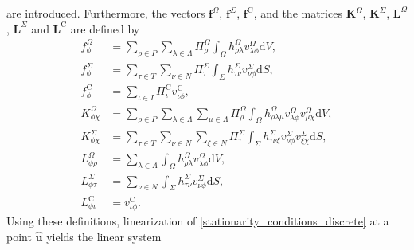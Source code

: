 \documentclass[pdftex,a4paper,12pt,abstracton]{scrartcl}
\begin{document}
are introduced. 
Furthermore, the vectors $\boldsymbol{f}^\Omega$, $\boldsymbol{f}^\Sigma$, $\boldsymbol{f}^\mathrm{C}$, and the matrices $\boldsymbol{K}^\Omega$, $\boldsymbol{K}^\Sigma$, $\boldsymbol{L}^\Omega$, $\boldsymbol{L}^\Sigma$ and $\boldsymbol{L}^\mathrm{C}$ are defined by
\begin{equation}
\begin{split}
f^\Omega_\phi &= \sum_{\rho \in P} \sum_{\lambda \in \Lambda} \Pi^\Omega_\rho \int_\Omega h^\Omega_{\rho\lambda} v^\Omega_{\lambda\phi} \mathrm{d}V,\\
f^\Sigma_\phi &= \sum_{\tau \in T} \sum_{\nu \in N} \Pi^\Sigma_\tau \int_\Sigma h^\Sigma_{\tau\nu} v^\Sigma_{\nu\phi} \mathrm{d}S,\\
f^\mathrm{C}_\phi &= \sum_{\iota \in I} \Pi^\mathrm{C}_\iota v^\mathrm{C}_{\iota\phi},\\
K^\Omega_{\phi\chi} &= \sum_{\rho \in P} \sum_{\lambda \in \Lambda} \sum_{\mu \in \Lambda} \Pi^\Omega_\rho \int_\Omega h^\Omega_{\rho \lambda \mu} v^\Omega_{\lambda\phi} v^\Omega_{\mu\chi} \mathrm{d}V,\\
K^\Sigma_{\phi\chi} &= \sum_{\tau \in T} \sum_{\nu \in N} \sum_{\xi \in N} \Pi^\Sigma_\tau \int_\Sigma h^\Sigma_{\tau \nu \xi} v^\Sigma_{\nu\phi} v^\Sigma_{\xi\chi} \mathrm{d}S,\\
L^\Omega_{\phi\rho} &= \sum_{\lambda \in \Lambda} \int_\Omega h^\Omega_{\rho\lambda} v^\Omega_{\lambda\phi} \mathrm{d}V,\\
L^\Sigma_{\phi\tau} &= \sum_{\nu \in N} \int_\Sigma h^\Sigma_{\tau\nu} v^\Sigma_{\nu\phi} \mathrm{d}S,\\
L^\mathrm{C}_{\phi\iota} &= v^\mathrm{C}_{\iota\phi}.
\end{split}
\end{equation}
Using these definitions, linearization of \eqref{stationarity_conditions_discrete} at a point $\boldsymbol{\hat u}$ yields the linear system
\end{document}
